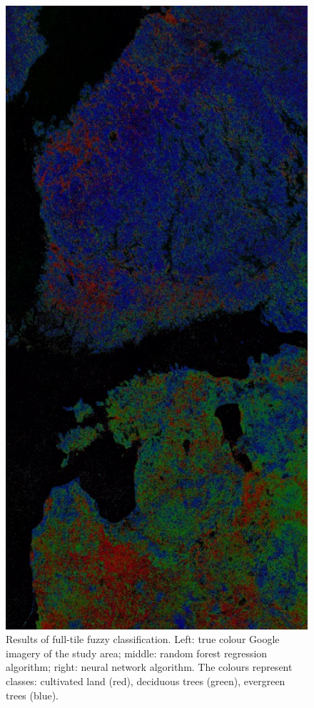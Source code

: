 \documentclass[20pt]{beamer}
\begin{document}
\begin{frame}{}
\begin{textblock}{7}
\begin{figure}
		  \includegraphics[width=2.3\TPHorizModule]{../thesis/thesis-figures/figures-qgis/fulltile-nn}
		  \caption{Results of full-tile fuzzy classification. Left: true colour Google imagery of the study area; middle: random forest regression algorithm; right: neural network algorithm. The colours represent classes: cultivated land (red), deciduous trees (green), evergreen trees (blue).}
		\end{figure}
		

\end{textblock}
\end{frame}
\end{document}
